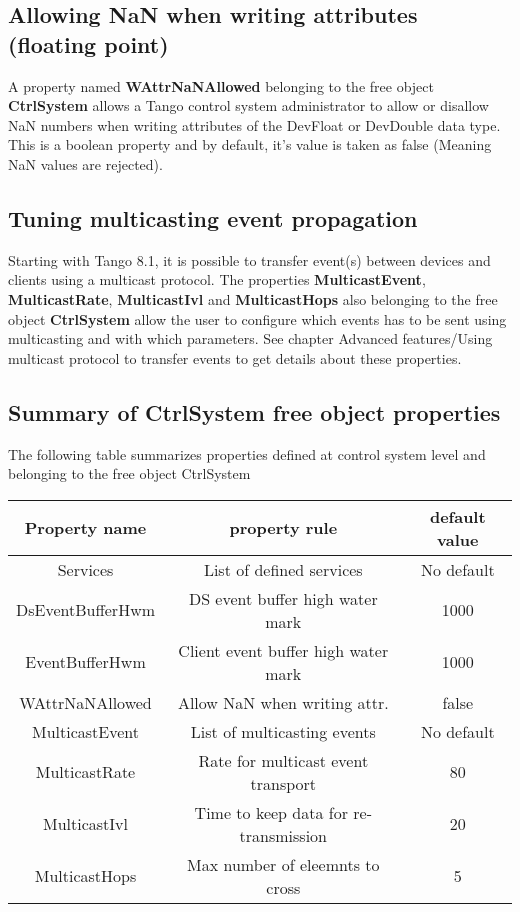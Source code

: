 \subsection{Allowing NaN when writing attributes (floating point)}

A property named \textbf{WAttrNaNAllowed}
belonging to the free object \textbf{CtrlSystem}
allows a Tango control system administrator to allow or disallow NaN
numbers when writing attributes of the DevFloat or DevDouble data
type. This is a boolean property and by default, it's value is taken
as false (Meaning NaN values are rejected).


\subsection{Tuning multicasting event propagation}

Starting with Tango 8.1, it is possible to transfer event(s) between
devices and clients using a multicast protocol. The properties \textbf{MulticastEvent},
\textbf{MulticastRate}, \textbf{MulticastIvl}
and \textbf{MulticastHops} also belonging to
the free object \textbf{CtrlSystem} allow the user to configure which
events has to be sent using multicasting and with which parameters.
See chapter \textquotedbl{}Advanced features/Using multicast protocol
to transfer events\textquotedbl{} to get details about these properties.


\subsection{Summary of CtrlSystem free object properties}

The following table summarizes properties defined at control system
level and belonging to the free object CtrlSystem

\vspace{0.3cm}


\begin{center}
\begin{longtable}{|c|c|c|}
\hline 
Property name & property rule & default value\tabularnewline
\hline 
\hline 
Services & List of defined services & No default\tabularnewline
\hline 
DsEventBufferHwm & DS event buffer high water mark & 1000\tabularnewline
\hline 
EventBufferHwm & Client event buffer high water mark & 1000\tabularnewline
\hline 
WAttrNaNAllowed & Allow NaN when writing attr. & false\tabularnewline
\hline 
MulticastEvent & List of multicasting events & No default\tabularnewline
\hline 
MulticastRate & Rate for multicast event transport & 80\tabularnewline
\hline 
MulticastIvl & Time to keep data for re-transmission & 20\tabularnewline
\hline 
MulticastHops & Max number of eleemnts to cross & 5\tabularnewline
\hline 
\end{longtable}
\par\end{center}

